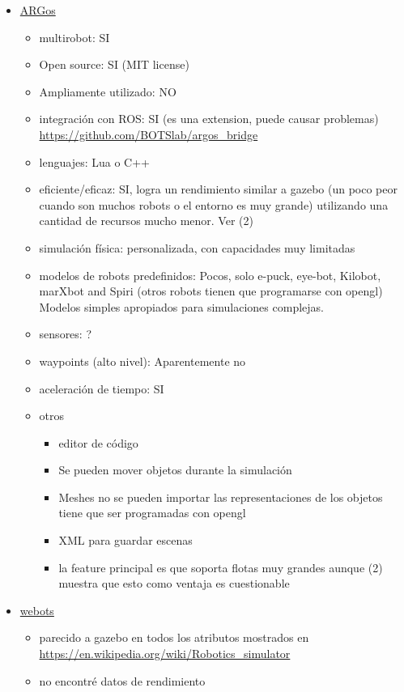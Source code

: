 \begin{itemize}
  \item \href{https://www.argos-sim.info/index.php}{ARGos}
  \begin{itemize}
    \item multirobot:                     SI
    \item Open source:                    SI (MIT license)
    \item Ampliamente utilizado:          NO
    \item integración con ROS:            SI (es una extension, puede causar problemas) \url{https://github.com/BOTSlab/argos_bridge}
    \item lenguajes:                      Lua o C++
    \item eficiente/eficaz:               SI, logra un rendimiento similar a gazebo (un poco peor cuando son muchos robots o el entorno es muy grande) utilizando una
                                      cantidad de recursos mucho menor. Ver (2)
    \item simulación física:              personalizada, con capacidades muy limitadas 
    \item modelos de robots predefinidos: Pocos, solo e-puck, eye-bot, Kilobot, marXbot and Spiri (otros robots tienen que programarse con opengl)
                                      Modelos simples apropiados para simulaciones complejas.
    \item sensores:                       ?
    \item waypoints (alto nivel):         Aparentemente no 
    \item aceleración de tiempo:          SI
    \item otros
    \begin{itemize}
      \item editor de código
      \item Se pueden mover objetos durante la simulación
      \item Meshes no se pueden importar las representaciones de los objetos tiene que ser programadas con opengl
      \item XML para guardar escenas
      \item la feature principal es que soporta flotas muy grandes aunque (2) muestra que esto como ventaja es cuestionable
    \end{itemize}
  \end{itemize}

  \item \href{https://cyberbotics.com/}{webots}
  \begin{itemize}
    \item parecido a gazebo en todos los atributos mostrados en \url{https://en.wikipedia.org/wiki/Robotics_simulator}
    \item no encontré datos de rendimiento


\end{itemize}
\end{itemize}
